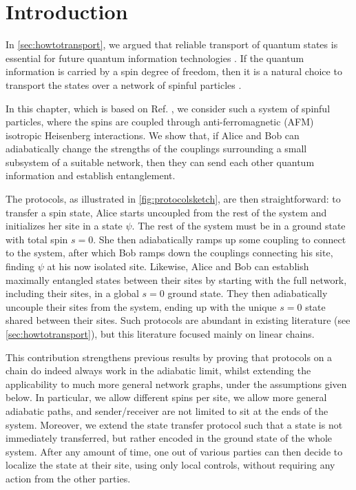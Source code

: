 \section{Introduction}

In \cref{sec:howtotransport}, we argued that reliable transport of quantum states is essential for future quantum information technologies \cite{DiVincenzo2000}. If the quantum information is carried by a spin degree of freedom, then it is a natural choice to transport the states over a network of spinful particles \cite{Bose2007,Nikolopoulos2014}. 

In this chapter, which is based on Ref. \cite{Groenland2019}, we consider such a system of spinful particles, where the spins are coupled through anti-ferromagnetic (AFM) isotropic Heisenberg interactions. We show that, if Alice and Bob can adiabatically change the strengths of the couplings surrounding a small subsystem of a suitable network, then they can send each other quantum information and establish entanglement. 

The protocols, as illustrated in \cref{fig:protocolsketch}, are then straightforward: to transfer a spin state, Alice starts uncoupled from the rest of the system and initializes her site in a state $\psi$. The rest of the system must be in a ground state with total spin $s=0$. She then adiabatically ramps up some coupling to connect to the system, after which Bob ramps down the couplings connecting his site, finding $\psi$ at his now isolated site. Likewise, Alice and Bob can establish maximally entangled states between their sites by starting with the full network, including their sites, in a global $s=0$ ground state. They then adiabatically uncouple their sites from the system, ending up with the unique $s=0$ state shared between their sites. Such protocols are abundant in existing literature (see \cref{sec:howtotransport}), but this literature focused mainly on linear chains. 

This contribution strengthens previous results by proving that protocols on a chain do indeed always work in the adiabatic limit, whilst extending the applicability to much more general network graphs, under the assumptions given below. In particular, we allow different spins per site, we allow more general adiabatic paths, and sender/receiver are not limited to sit at the ends of the system. 
Moreover, we extend the state transfer protocol such that a state is not immediately transferred, but rather encoded in the ground state of the whole system. After any amount of time, one out of various parties can then decide to localize the state at their site, using only local controls, without requiring any action from the other parties. 


